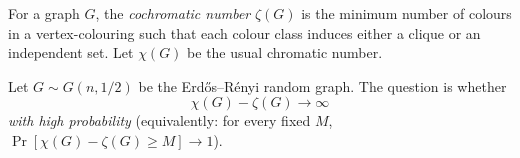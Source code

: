 For a graph $G$, the \emph{cochromatic number} $\zeta(G)$ is the minimum number of colours in a vertex-colouring such that each colour class induces either a clique or an independent set. Let $\chi(G)$ be the usual chromatic number.

Let $G\sim G(n,1/2)$ be the Erd\H{o}s--R\'enyi random graph.
The question is whether
\[
\chi(G)-\zeta(G)\to\infty
\]
\emph{with high probability} (equivalently: for every fixed $M$, $\Pr[\chi(G)-\zeta(G)\ge M]\to 1$).
